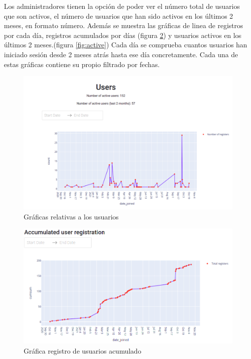 Los administradores tienen la opción de poder ver el número total de usuarios que son activos, el número de usuarios que han sido activos en los últimos 2 meses, en formato número. Además se muestra las gráficas de linea de registros por cada día, registros acumulados por días (figura \ref{fig:accumulated}) y usuarios activos en los últimos 2 meses.(figura \ref{fig:active}) Cada día se comprueba cuantos usuarios han iniciado sesión desde 2 meses atrás hasta ese día concretamente. Cada una de estas gráficas contiene su propio filtrado por fechas. 

\begin{figure}[H]
    \centering
    \includegraphics[width=17cm, keepaspectratio]{img/users.png}
    \caption{Gráficas relativas a los usuarios}
    \label{fig:users}
\end{figure}
\begin{figure}[H]
    \centering
    \includegraphics[width=17cm, keepaspectratio]{img/accumulated.png}
    \caption{Gráfica registro de usuarios acumulado}
    \label{fig:accumulated}
\end{figure}

